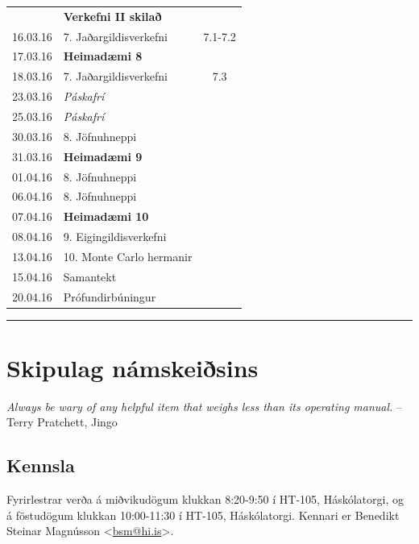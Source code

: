 \documentclass[letterpaper,10pt,icelandic]{sphinxmanual}
\begin{document}
\begin{center}
\begin{tabular}{c|l|c}
		& \textbf{Verkefni II skilað} & \\
		16.03.16 & 7. Jaðargildisverkefni & 7.1-7.2\\
		17.03.16 & \textbf{Heimadæmi 8} & \\
		18.03.16 & 7. Jaðargildisverkefni & 7.3\\\hline
		23.03.16 & \emph{Páskafrí} & \\
		25.03.16 & \emph{Páskafrí} & \\\hline
		30.03.16 & 8. Jöfnuhneppi & \\
		31.03.16 & \textbf{Heimadæmi 9} &\\
		01.04.16 & 8. Jöfnuhneppi & \\\hline
		06.04.16 & 8. Jöfnuhneppi & \\
		07.04.16 & \textbf{Heimadæmi 10}\\
		08.04.16 & 9. Eigingildisverkefni &\\\hline
		13.04.16 & 10. Monte Carlo hermanir &\\
		15.04.16 & Samantekt & \\\hline
		20.04.16 & Prófundirbúningur & \\\hline
	\end{tabular}
\end{center}


\bigskip\hrule{}\bigskip

\newpage

\section{Skipulag námskeiðsins}
\label{vidauki:skipulag-namskeisins}
\emph{Always be wary of any helpful item that weighs less than its operating manual.}
-- Terry Pratchett, Jingo


\subsection{Kennsla}
\label{vidauki:kennsla}
Fyrirlestrar verða á miðvikudögum klukkan 8:20-9:50 í HT-105, Háskólatorgi, og á föstudögum klukkan 10:00-11:30 í HT-105, Háskólatorgi.
Kennari er Benedikt Steinar Magnússon \textless{}\href{mailto:bsm@hi.is}{bsm@hi.is}\textgreater{}.
\end{document}
